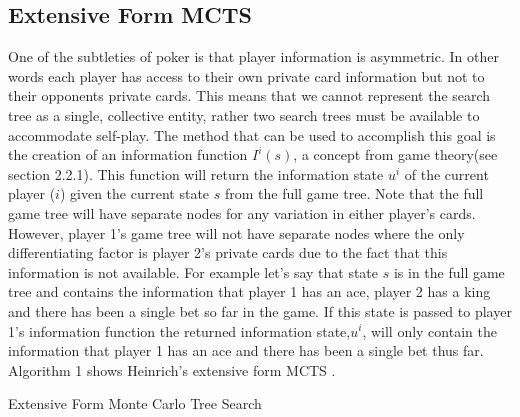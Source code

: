 \subsection{Extensive Form MCTS}\label{subsec:extensiveMCTS}
One of the subtleties of poker is that player information is asymmetric.
In other words each player has access to their own private card 
information but not to their opponents private cards.
This means that we cannot represent the search tree as a single, collective 
entity\citep{heinrich2017reinforcement}, rather two search trees must be available 
to accommodate self-play.
The method that can be used to accomplish this goal is the creation of
an information function $I^i(s)$, a concept from game theory(see section 2.2.1).
This function will return the information state $u^i$ of the current player ($i$) given
the current state $s$ from the full game tree.
Note that the full game tree will have separate nodes for any variation
in either player's cards.
However, player 1's game tree will not have separate nodes where the only 
differentiating factor is player 2's private cards\citep{johanson2011accelerating} 
due to the fact that this information is not available.
For example let's say that state $s$ is in the full game tree and contains the information
that player 1 has an ace, player 2 has a king and there has been a single bet so far in the game.
If this state is passed to player 1's information function the returned information
state,$u^i$, will only contain the information that player 1 has an ace and there has been a single bet thus far.
Algorithm 1 shows Heinrich's extensive form MCTS .

\begin{algorithm}[H]
    \DontPrintSemicolon
    \LinesNumbered
    \caption{Extensive Form Monte Carlo Tree Search}
\end{algorithm}

